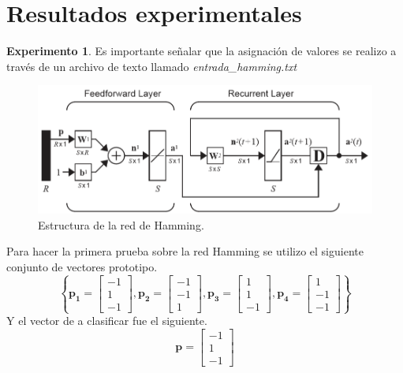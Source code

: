 \documentclass[12pt, titlepage]{article}
\begin{document}
    \section{Resultados experimentales}
    \textbf{Experimento 1}. Es importante señalar que la asignación de valores se realizo a través de un archivo de texto llamado \emph{entrada\_hamming.txt}
    \begin{figure}[H]
        \begin{center}
            \includegraphics[width=16cm]{img/hamming/diagrama.png}
            \caption{Estructura de la red de Hamming. \cite{libro1}}
            \label{fig:hamming-diagrama2}
        \end{center}
    \end{figure}
    Para hacer la primera prueba sobre la red Hamming se utilizo el siguiente conjunto de vectores prototipo.
    \[ \left\lbrace \boldsymbol{p_1} = \left[\begin{array}{c}-1\\ 1\\ -1\end{array}\right], \boldsymbol{p_2} = \left[\begin{array}{c}-1\\ -1\\ 1\end{array}\right], \boldsymbol{p_3} = \left[\begin{array}{c}1\\ 1\\ -1\end{array}\right], \boldsymbol{p_4} = \left[\begin{array}{c}1\\ -1\\ -1\end{array}\right] \right\rbrace \]
    Y el vector de a clasificar fue el siguiente.
    \[ \boldsymbol{p} = \left[\begin{array}{c}-1\\ 1\\ -1\end{array}\right] \]
\end{document}
